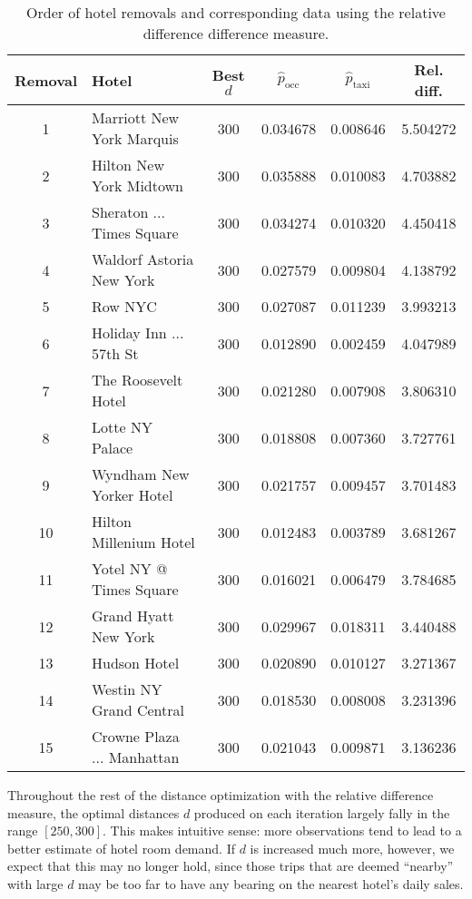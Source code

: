\documentclass[useAMS, usenatbib]{biom}
\begin{document}
\begin{table}
\caption{Order of hotel removals and corresponding data using the relative difference difference measure.}
\label{t:relative_difference}
\begin{center}
\resizebox{\columnwidth}{!}
{
 \begin{tabular}{||c|l|c|c|c|c||}
 \hline
 Removal & Hotel & Best $d$ & $\hat{p}_{\mathrm{occ}}$ & $\hat{p}_{\mathrm{taxi}}$ & Rel. diff. \\ [0.5ex] 
 \hline
1   & Marriott New York Marquis & 300 & 0.034678 & 0.008646 & 5.504272 \\
2   & Hilton New York Midtown & 300 & 0.035888 & 0.010083 & 4.703882 \\
3   & Sheraton ... Times Square & 300 & 0.034274 & 0.010320 & 4.450418 \\
4   & Waldorf Astoria New York & 300 & 0.027579 & 0.009804 & 4.138792 \\
5   & Row NYC & 300 & 0.027087 & 0.011239 & 3.993213 \\
6   & Holiday Inn ... 57th St & 300 & 0.012890 & 0.002459 & 4.047989 \\
7   & The Roosevelt Hotel & 300 & 0.021280 & 0.007908 & 3.806310 \\
8   & Lotte NY Palace & 300 & 0.018808 & 0.007360 & 3.727761 \\
9   & Wyndham New Yorker Hotel & 300 & 0.021757 & 0.009457 & 3.701483 \\
10  & Hilton Millenium Hotel & 300 & 0.012483 & 0.003789 & 3.681267 \\
11  & Yotel NY @ Times Square & 300 & 0.016021 & 0.006479 & 3.784685 \\
12  & Grand Hyatt New York & 300 & 0.029967 & 0.018311 & 3.440488 \\
13  & Hudson Hotel & 300 & 0.020890 & 0.010127 & 3.271367 \\
14  & Westin NY Grand Central & 300 & 0.018530 & 0.008008 & 3.231396 \\
15  & Crowne Plaza ... Manhattan & 300 & 0.021043 & 0.009871 & 3.136236 \\

 \hline
\end{tabular}
}
\end{center}
\end{table}

Throughout the rest of the distance optimization with the relative difference measure, the optimal distances $d$ produced on each iteration largely fally in the range $[250, 300]$. This makes intuitive sense: more observations tend to lead to a better estimate of hotel room demand. If $d$ is increased much more, however, we expect that this may no longer hold, since those trips that are deemed ``nearby'' with large $d$ may be too far to have any bearing on the nearest hotel's daily sales.
\end{document}

